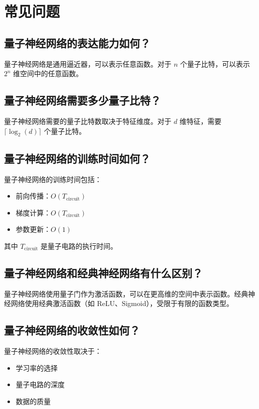 \documentclass[12pt,a4paper]{article}
\begin{document}
\section{常见问题}

\subsection{量子神经网络的表达能力如何？}

量子神经网络是通用逼近器，可以表示任意函数。对于 $n$ 个量子比特，可以表示 $2^n$ 维空间中的任意函数。

\subsection{量子神经网络需要多少量子比特？}

量子神经网络需要的量子比特数取决于特征维度。对于 $d$ 维特征，需要 $\lceil \log_2(d) \rceil$ 个量子比特。

\subsection{量子神经网络的训练时间如何？}

量子神经网络的训练时间包括：
\begin{itemize}
  \item 前向传播：$O(T_{\text{circuit}})$
  \item 梯度计算：$O(T_{\text{circuit}})$
  \item 参数更新：$O(1)$
\end{itemize}

其中 $T_{\text{circuit}}$ 是量子电路的执行时间。

\subsection{量子神经网络和经典神经网络有什么区别？}

量子神经网络使用量子门作为激活函数，可以在更高维的空间中表示函数。经典神经网络使用经典激活函数（如 ReLU、Sigmoid），受限于有限的函数类型。

\subsection{量子神经网络的收敛性如何？}

量子神经网络的收敛性取决于：
\begin{itemize}
  \item 学习率的选择
  \item 量子电路的深度
  \item 数据的质量
\end{itemize}
\end{document}
